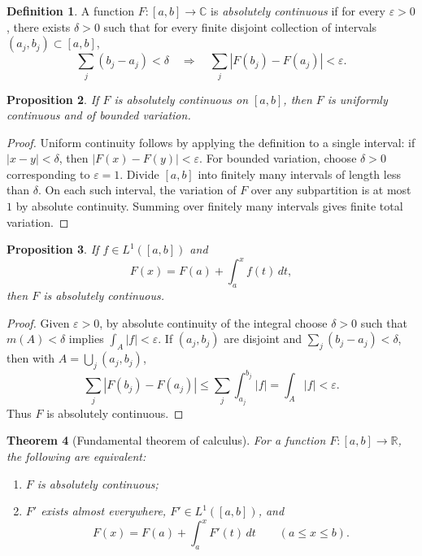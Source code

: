 \documentclass[11pt,openany]{book}
\numberwithin{equation}{chapter}
\theoremstyle{definition}
\newtheorem{definition}{Definition}[chapter]
\theoremstyle{plain}
\newtheorem{theorem}[definition]{Theorem}
\newtheorem{proposition}[definition]{Proposition}
\theoremstyle{remark}
\newcommand{\R}{\mathbb{R}}
\newcommand{\C}{\mathbb{C}}
\newcommand{\eps}{\varepsilon}
\newcommand{\1}{\mathbf{1}}
\newcommand{\dd}{\,d}
\newcommand{\abs}[1]{\left\lvert #1\right\rvert}
\begin{document}
\begin{definition}
A function \(F:[a,b]\to\C\) is \emph{absolutely continuous} if for every \(\eps>0\), there exists \(\delta>0\) such that for every finite disjoint collection of intervals \((a_j,b_j)\subset[a,b]\),
\[
    \sum_j(b_j-a_j)<\delta
    \quad\Longrightarrow\quad
    \sum_j\abs{F(b_j)-F(a_j)}<\eps.
\]
\end{definition}

\begin{proposition}
If \(F\) is absolutely continuous on \([a,b]\), then \(F\) is uniformly continuous and of bounded variation.
\end{proposition}

\begin{proof}
Uniform continuity follows by applying the definition to a single interval: if \(\abs{x-y}<\delta\), then \(\abs{F(x)-F(y)}<\eps\).  For bounded variation, choose \(\delta>0\) corresponding to \(\eps=1\).  Divide \([a,b]\) into finitely many intervals of length less than \(\delta\).  On each such interval, the variation of \(F\) over any subpartition is at most \(1\) by absolute continuity.  Summing over finitely many intervals gives finite total variation.
\end{proof}

\begin{proposition}
If \(f\in L^1([a,b])\) and
\[
    F(x)=F(a)+\int_a^x f(t)\dd t,
\]
then \(F\) is absolutely continuous.
\end{proposition}

\begin{proof}
Given \(\eps>0\), by absolute continuity of the integral choose \(\delta>0\) such that \(m(A)<\delta\) implies \(\int_A\abs f<\eps\).  If \((a_j,b_j)\) are disjoint and \(\sum_j(b_j-a_j)<\delta\), then with \(A=\bigcup_j(a_j,b_j)\),
\[
    \sum_j\abs{F(b_j)-F(a_j)}
    \le\sum_j\int_{a_j}^{b_j}\abs f
    =\int_A\abs f<\eps.
\]
Thus \(F\) is absolutely continuous.
\end{proof}

\begin{theorem}[Fundamental theorem of calculus]
For a function \(F:[a,b]\to\R\), the following are equivalent:
\begin{enumerate}[label=(\roman*)]
    \item \(F\) is absolutely continuous;
    \item \(F'\) exists almost everywhere, \(F'\in L^1([a,b])\), and
    \[
        F(x)=F(a)+\int_a^x F'(t)\dd t\qquad(a\le x\le b).
    \]
\end{enumerate}
\end{theorem}
\end{document}
